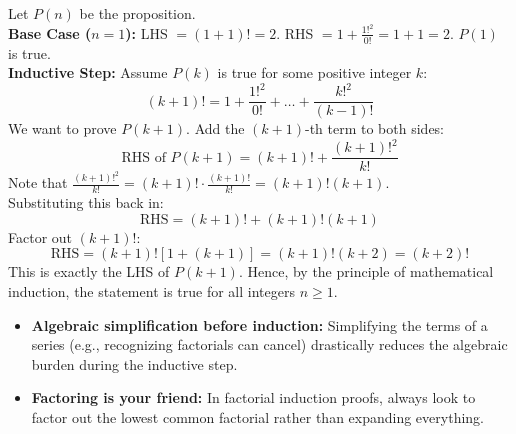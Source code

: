\begin{solution}[Brief]
Let $P(n)$ be the proposition.\\
\textbf{Base Case ($n=1$):} LHS $= (1+1)! = 2$. RHS $= 1 + \frac{1!^2}{0!} = 1 + 1 = 2$. $P(1)$ is true.\\
\textbf{Inductive Step:} Assume $P(k)$ is true for some positive integer $k$:
$$ (k+1)! = 1 + \frac{1!^2}{0!} + \dots + \frac{k!^2}{(k-1)!} $$
We want to prove $P(k+1)$. Add the $(k+1)$-th term to both sides:
$$ \text{RHS of } P(k+1) = (k+1)! + \frac{(k+1)!^2}{k!} $$
Note that $\frac{(k+1)!^2}{k!} = (k+1)! \cdot \frac{(k+1)!}{k!} = (k+1)!(k+1)$.\\
Substituting this back in:
$$ \text{RHS} = (k+1)! + (k+1)!(k+1) $$
Factor out $(k+1)!$:
$$ \text{RHS} = (k+1)![1 + (k+1)] = (k+1)!(k+2) = (k+2)! $$
This is exactly the LHS of $P(k+1)$. Hence, by the principle of mathematical induction, the statement is true for all integers $n \ge 1$.
\end{solution}

\begin{takeaways}
\begin{itemize}
    \item \textbf{Algebraic simplification before induction:} Simplifying the terms of a series (e.g., recognizing factorials can cancel) drastically reduces the algebraic burden during the inductive step.
    \item \textbf{Factoring is your friend:} In factorial induction proofs, always look to factor out the lowest common factorial rather than expanding everything.
\end{itemize}
\end{takeaways}
